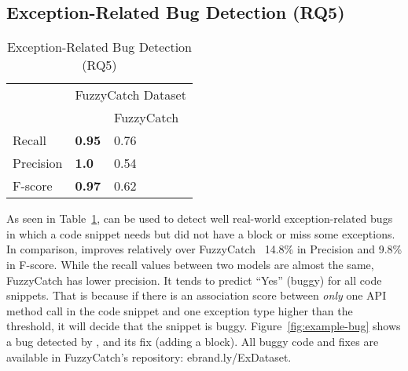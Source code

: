 \subsection{Exception-Related Bug Detection (RQ5)}
\label{sec:rq1}

\begin{table}[t]%
  \caption {Exception-Related Bug Detection (RQ5)}
  \vspace{-12pt}
  \small
	\begin{center}
		\renewcommand{\arraystretch}{1}
		\begin{tabular}{|p{1.75cm}<{\centering}|p{1.75cm}<{\centering}|p{1.75cm}<{\centering}|}
		  \hline
			\multirow{2}{*}{} & \multicolumn{2}{c|}{FuzzyCatch Dataset} \\
			\cline{2-3}
			  & \tool  & FuzzyCatch~\cite{xrank-fse20} \\
			\hline
			Recall    & \textbf{0.95}& 0.76\\
			Precision & \textbf{1.0} & 0.54\\
			F-score   & \textbf{0.97} & 0.62\\
			\hline
		\end{tabular}
		\label{tab:bug}
	\end{center}
\end{table}



As seen in Table~\ref{tab:bug}, {\tool} can be used to detect well
real-world exception-related bugs in which a code snippet needs but
did not have a  block or miss some exceptions. In
comparison, {\tool} improves relatively over
FuzzyCatch~\cite{xrank-fse20} 14.8\% in Precision and
9.8\% in F-score.
While the recall values between two models are almost the same,
FuzzyCatch has lower precision. It tends to predict ``Yes'' (buggy)
for all code snippets. That is because if there is an association
score between {\em only} one API method call in the code snippet and
one exception type higher than the threshold, it will decide that the
snippet is buggy. Figure~\ref{fig:example-bug} shows a bug detected by
{\tool}, and its fix (adding a  block). All buggy code
and fixes are available in FuzzyCatch's repository:
ebrand.ly/ExDataset.




